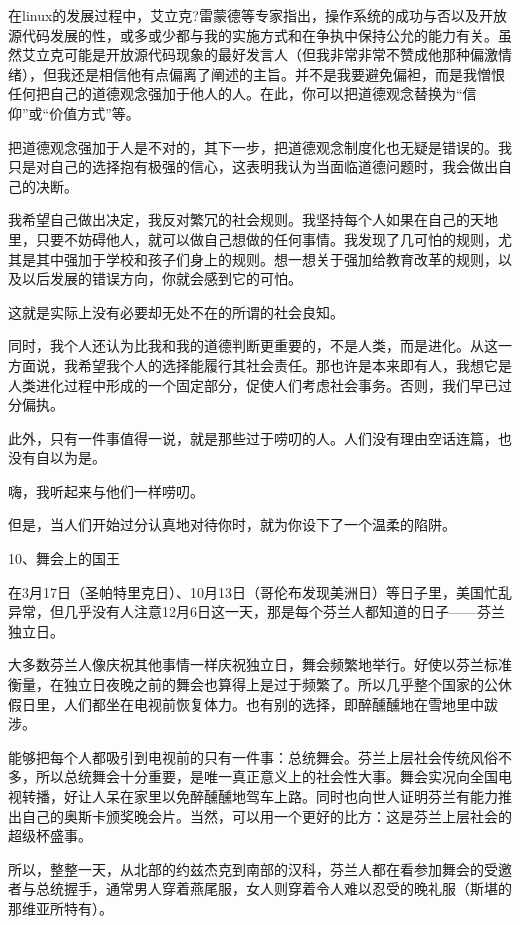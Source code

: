 在linux的发展过程中，艾立克?雷蒙德等专家指出，操作系统的成功与否以及开放源代码发展的性，或多或少都与我的实施方式和在争执中保持公允的能力有关。虽然艾立克可能是开放源代码现象的最好发言人（但我非常非常不赞成他那种偏激情绪），但我还是相信他有点偏离了阐述的主旨。并不是我要避免偏袒，而是我憎恨任何把自己的道德观念强加于他人的人。在此，你可以把道德观念替换为“信仰”或“价值方式”等。

把道德观念强加于人是不对的，其下一步，把道德观念制度化也无疑是错误的。我只是对自己的选择抱有极强的信心，这表明我认为当面临道德问题时，我会做出自己的决断。

我希望自己做出决定，我反对繁冗的社会规则。我坚持每个人如果在自己的天地里，只要不妨碍他人，就可以做自己想做的任何事情。我发现了几可怕的规则，尤其是其中强加于学校和孩子们身上的规则。想一想关于强加给教育改革的规则，以及以后发展的错误方向，你就会感到它的可怕。

这就是实际上没有必要却无处不在的所谓的社会良知。

同时，我个人还认为比我和我的道德判断更重要的，不是人类，而是进化。从这一方面说，我希望我个人的选择能履行其社会责任。那也许是本来即有人，我想它是人类进化过程中形成的一个固定部分，促使人们考虑社会事务。否则，我们早已过分偏执。

此外，只有一件事值得一说，就是那些过于唠叨的人。人们没有理由空话连篇，也没有自以为是。

嗨，我听起来与他们一样唠叨。

但是，当人们开始过分认真地对待你时，就为你设下了一个温柔的陷阱。

 
10、舞会上的国王

在3月17日（圣帕特里克日）、10月13日（哥伦布发现美洲日）等日子里，美国忙乱异常，但几乎没有人注意12月6日这一天，那是每个芬兰人都知道的日子——芬兰独立日。

大多数芬兰人像庆祝其他事情一样庆祝独立日，舞会频繁地举行。好使以芬兰标准衡量，在独立日夜晚之前的舞会也算得上是过于频繁了。所以几乎整个国家的公休假日里，人们都坐在电视前恢复体力。也有别的选择，即醉醺醺地在雪地里中跋涉。

能够把每个人都吸引到电视前的只有一件事：总统舞会。芬兰上层社会传统风俗不多，所以总统舞会十分重要，是唯一真正意义上的社会性大事。舞会实况向全国电视转播，好让人呆在家里以免醉醺醺地驾车上路。同时也向世人证明芬兰有能力推出自己的奥斯卡颁奖晚会片。当然，可以用一个更好的比方：这是芬兰上层社会的超级杯盛事。

所以，整整一天，从北部的约兹杰克到南部的汉科，芬兰人都在看参加舞会的受邀者与总统握手，通常男人穿着燕尾服，女人则穿着令人难以忍受的晚礼服（斯堪的那维亚所特有）。

